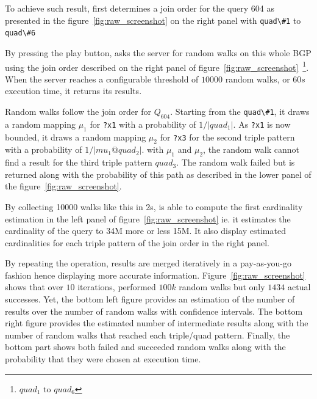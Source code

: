  
To achieve such result,  \NAME first determines a join order for the
query 604 as presented in the figure~\ref{fig:raw_screenshot} on the
right panel with \verb+quad\#1+ to \verb+quad\#6+ 

 
 

By pressing the play button, \NAME asks the server for random walks on
this whole BGP using the join order described on the right panel of
figure~\ref{fig:raw_screenshot}~\footnote{$quad_1$ to  $quad_6$ }. When the server reaches a configurable threshold
of $10 000$ random walks, or $60s$ execution time, it returns its
results.

Random walks follow the join order for $Q_{604}$. Starting from the
\verb+quad\#1+, it draws a random mapping $\mu_1$ for \verb+?x1+ with
a probability of $1/|quad_1|$. As \verb+?x1+ is now bounded, it draws a
random mapping $\mu_2$ for \verb+?x3+ for the second triple pattern
with a probability of $1/|mu_1@quad_2|$. with $\mu_1$ and $\mu_2$, the
random walk cannot find a result for the third triple pattern
$quad_3$. The random walk failed but is returned along with the
probability of this path as described in the lower panel of the
figure~\ref{fig:raw_screenshot}.

By collecting 10000 walks like this in 2s, \NAME is able to compute
the first cardinality estimation in the left panel of
figure~\ref{fig:raw_screenshot} ie. it estimates the cardinality of
the query to 34M more or less 15M. It also display estimated
cardinalities for each triple pattern of the join order in the right panel.

By repeating the operation, results are
merged iteratively in a pay-as-you-go fashion hence displaying more
accurate information. Figure~\ref{fig:raw_screenshot} shows that over
$10$ iterations, \NAME performed $100k$ random walks but only $1434$
actual successes.  Yet, the bottom left figure provides an estimation
of the number of results over the number of random walks with
confidence intervals. The bottom right figure provides the estimated
number of intermediate results along with the number of random walks
that reached each triple/quad pattern.  Finally, the bottom part shows
both failed and succeeded random walks along with the probability that
they were chosen at execution time.

 
 
